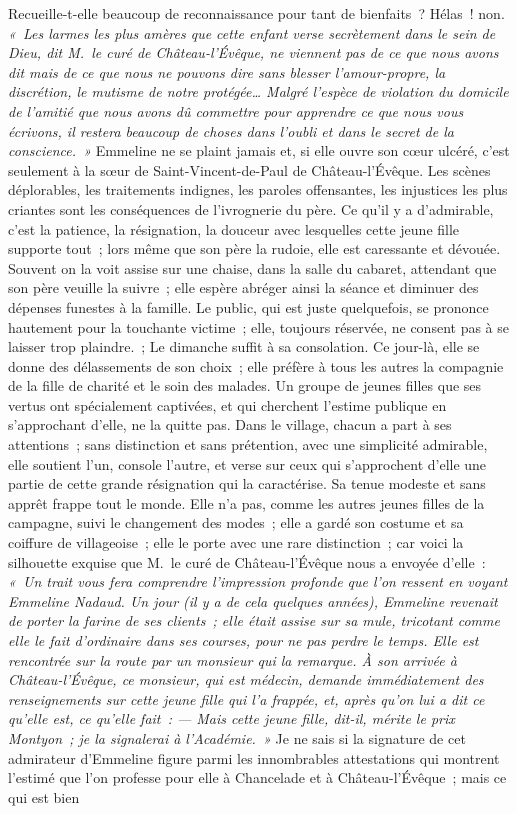 \documentclass[french,twoside]{book} %
\newcommand\orgName[1]{#1}
\newcommand\persName[1]{#1}
\newcommand\placeName[1]{#1}
\begin{document}
Recueille-t-elle beaucoup de reconnaissance pour tant de bienfaits ? Hélas ! non. \emph{« Les larmes les plus amères que cette enfant verse secrètement dans le sein de Dieu, dit {\persName M. le curé de Château-l’Évêque}, ne viennent pas de ce que nous avons dit mais de ce que nous ne pouvons dire sans blesser l’amour-propre, la discrétion, le mutisme de notre protégée… Malgré l’espèce de violation du domicile de l’amitié que nous avons dû commettre pour apprendre ce que nous vous écrivons, il restera beaucoup de choses dans l’oubli et dans le secret de la conscience. »} Emmeline ne se plaint jamais et, si elle ouvre son cœur ulcéré, c’est seulement à la sœur de {\orgName Saint-Vincent-de-Paul} de {\placeName Château-l’Évêque}. Les scènes déplorables, les traitements indignes, les paroles offensantes, les injustices les plus criantes sont les conséquences de l’ivrognerie du père. Ce qu’il y a d’admirable, c’est la patience, la résignation, la douceur avec lesquelles cette jeune fille supporte tout ; lors même que son père la rudoie, elle est caressante et dévouée. Souvent on la voit assise sur une chaise, dans la salle du cabaret, attendant que son père veuille la suivre ; elle espère abréger ainsi la séance et diminuer des dépenses funestes à la famille. Le public, qui est juste quelquefois, se prononce hautement pour la touchante victime ; elle, toujours réservée, ne consent pas à se laisser trop plaindre. ; Le dimanche suffit à sa consolation. Ce jour-là, elle se donne des délassements de son choix ; elle préfère à tous les autres la compagnie de la fille de charité et le soin des malades. Un groupe de jeunes filles que ses vertus ont spécialement captivées, et qui cherchent l’estime publique en s’approchant d’elle, ne la quitte pas. Dans le village, chacun a part à ses attentions ; sans distinction et sans prétention, avec une simplicité admirable, elle soutient l’un, console l’autre, et verse sur ceux qui s’approchent d’elle une partie de cette grande résignation qui la caractérise. Sa tenue modeste et sans apprêt frappe tout le monde. Elle n’a pas, comme les autres jeunes filles de la campagne, suivi le changement des modes ; elle a gardé son costume et sa coiffure de villageoise ; elle le porte avec une rare distinction ; car voici la silhouette exquise que {\persName M. le curé de Château-l’Évêque} nous a envoyée d’elle : \emph{« Un trait vous fera comprendre l’impression profonde que l’on ressent en voyant {\persName Emmeline Nadaud}. Un jour (il y a de cela quelques années), {\persName Emmeline} revenait de porter la farine de ses clients ; elle était assise sur sa mule, tricotant comme elle le fait d’ordinaire dans ses courses, pour ne pas perdre le temps. Elle est rencontrée sur la route par un monsieur qui la remarque. À son arrivée à {\placeName Château-l’Évêque}, ce monsieur, qui est médecin, demande immédiatement des renseignements sur cette jeune fille qui l’a frappée, et, après qu’on lui a dit ce qu’elle est, ce qu’elle fait : — Mais cette jeune fille, dit-il, mérite le prix Montyon ; je la signalerai à l’{\orgName Académie}. »} Je ne sais si la signature de cet admirateur d’{\persName Emmeline} figure parmi les innombrables attestations qui montrent l’estimé que l’on professe pour elle à {\placeName Chancelade} et à Château-l’Évêque ; mais ce qui est bien 
\end{document}

